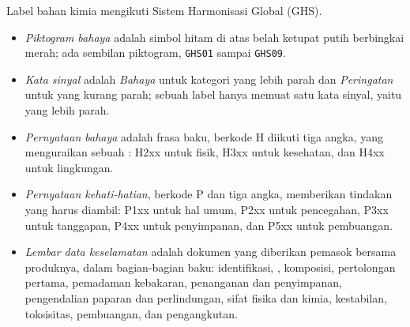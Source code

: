 \begin{definition}\label{def:b1:lab-techniques-1:ghs}
Label bahan kimia mengikuti Sistem Harmonisasi Global (GHS).
\begin{itemize}
  \item \emph{Piktogram bahaya} adalah simbol hitam
        di atas belah ketupat putih berbingkai merah; ada sembilan
        piktogram, \texttt{GHS01} sampai \texttt{GHS09}.
  \item \emph{Kata sinyal} adalah \emph{Bahaya} untuk
        kategori  yang lebih parah dan \emph{Peringatan} untuk yang
        kurang parah; sebuah label hanya memuat satu kata sinyal, yaitu
        yang lebih parah.
  \item \emph{Pernyataan bahaya} adalah frasa
        baku, berkode H diikuti tiga angka, yang menguraikan sebuah :
        H2xx untuk  fisik, H3xx untuk  kesehatan, dan H4xx
        untuk  lingkungan.
  \item \emph{Pernyataan kehati-hatian},
        berkode P dan tiga angka, memberikan tindakan yang harus diambil:
        P1xx untuk hal umum, P2xx untuk pencegahan, P3xx untuk tanggapan,
        P4xx untuk penyimpanan, dan P5xx untuk pembuangan.
  \item \emph{Lembar data keselamatan}
        adalah dokumen yang diberikan pemasok bersama produknya, dalam
        bagian-bagian baku: identifikasi, , komposisi, pertolongan
        pertama, pemadaman kebakaran, penanganan dan penyimpanan,
        pengendalian paparan dan perlindungan, sifat fisika dan kimia,
        kestabilan, toksisitas, pembuangan, dan pengangkutan.
\end{itemize}
\end{definition}

